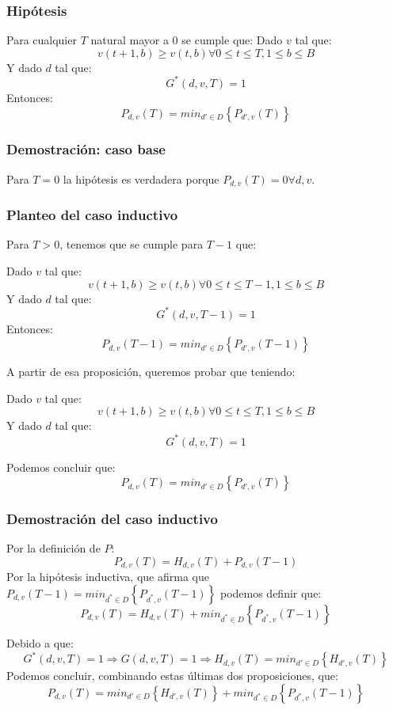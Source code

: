 \documentclass{article}
\begin{document}
\subsubsection{Hipótesis}
\begin{framed}
Para cualquier $T$ natural mayor a 0 se cumple que: \newline
Dado $v$ tal que: 
$$ v(t+1,b) 
\geq 
v(t,b) \forall 0 \leq t \leq T, 1 \leq b \leq B $$
Y dado $d$ tal que: $$G^*(d,v,T)=1$$
Entonces: $$P_{d,v}(T)=min_{d' \in D} \left \{ P_{d',v}(T) \right \}$$
\end{framed}

\subsubsection{Demostración: caso base}
Para $T=0$ la hipótesis es verdadera porque $P_{d,v}(T)=0 \forall d,v$.


\subsubsection{Planteo del caso inductivo}
Para $T > 0$, tenemos que se cumple para $T-1$ que:
\begin{framed}
Dado $v$ tal que: $$ v(t+1,b) \geq v(t,b) \forall 0 \leq t \leq T-1, 1 \leq b \leq B $$
Y dado $d$ tal que: $$G^*(d,v,T-1)=1$$
Entonces: $$P_{d,v}(T-1)=min_{d' \in D} \left \{ P_{d',v}(T-1) \right \}$$
\end{framed}
A partir de esa proposición, queremos probar que teniendo:
\begin{framed}
Dado $v$ tal que: $$ v(t+1,b) \geq v(t,b) \forall 0 \leq t \leq T, 1 \leq b \leq B $$
Y dado $d$ tal que: $$G^*(d,v,T)=1$$
\end{framed}
Podemos concluir que: $$P_{d,v}(T)=min_{d' \in D} \left \{ P_{d',v}(T) \right \}$$

\subsubsection{Demostración del caso inductivo}
Por la definición de $P$: $$P_{d,v}(T)=H_{d,v}(T)+P_{d,v}(T-1)$$
Por la hipótesis inductiva, que afirma que $P_{d,v}(T-1)=min_{d^* \in D}\left \{ P_{d^*,v}(T-1) \right \}$ podemos definir que:
$$P_{d,v}(T)=H_{d,v}(T)+min_{d^* \in D}\left \{ P_{d^*,v}(T-1) \right \}$$

Debido a que: $$G^*(d,v,T)=1 \Rightarrow G(d,v,T)=1 \Rightarrow H_{d,v}(T)=min_{d' \in D} \left \{ H_{d',v}(T) \right \}$$
Podemos concluir, combinando estas últimas dos proposiciones, que:
$$P_{d,v}(T)=min_{d' \in D} \left \{ H_{d',v}(T) \right \}+min_{d^* \in D}\left \{ P_{d^*,v}(T-1) \right \}$$
\end{document}
